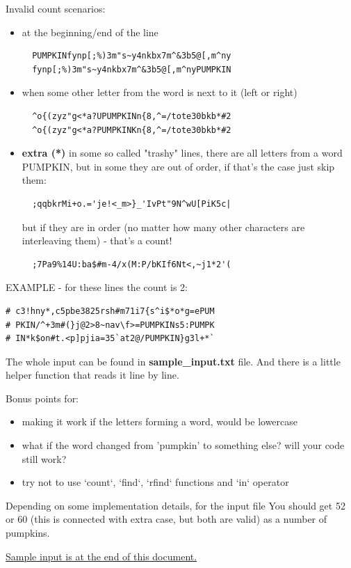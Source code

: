 \documentclass[12pt]{article}
\begin{document}
\begin{flushleft}
Invalid count scenarios:
\begin{itemize}
  \item at the beginning/end of the line
  \begin{verbatim}
  PUMPKINfynp[;%)3m"s~y4nkbx7m^&3b5@[,m^ny
  fynp[;%)3m"s~y4nkbx7m^&3b5@[,m^nyPUMPKIN
  \end{verbatim}
  \item when some other letter from the word is next to it (left or right)
  \begin{verbatim}
  ^o{(zyz"g<*a?UPUMPKINn{8,^=/tote30bkb*#2
  ^o{(zyz"g<*a?PUMPKINKn{8,^=/tote30bkb*#2
  \end{verbatim}
  \item \textbf{extra (*)} in some so called "trashy" lines, there are all letters from a word PUMPKIN, but in some they are out of order, if that's the case just skip them:
  \begin{verbatim}
  ;qqbkrMi+o.='je!<_m>}_'IvPt"9N^wU[PiK5c|
  \end{verbatim}
  but if they are in order (no matter how many other characters are interleaving them) - that's a count!
  \begin{verbatim}
  ;7Pa9%14U:ba$#m-4/x(M:P/bKIf6Nt<,~j1*2'(
  \end{verbatim}
\end{itemize}

EXAMPLE - for these lines the count is 2:
\begin{verbatim}
# c3!hny*,c5pbe3825rsh#m71i7{s^i$*o*g=ePUM
# PKIN/^+3m#(}j@2>8~nav\f>=PUMPKINs5:PUMPK
# IN*k$on#t.<p]pjia=35`at2@/PUMPKIN}g3l+*`
\end{verbatim}
\vspace{1cm}

The whole input can be found in \textbf{sample\_input.txt} file. And there is a little helper function that reads it line by line.
\vspace{0.5cm}

Bonus points for:

\begin{itemize}
  \item making it work if the letters forming a word, would be lowercase
  \item what if the word changed from 'pumpkin' to something else? will your code still work?
  \item try not to use `count`, `find`, `rfind` functions and `in` operator
\end{itemize}

\vspace{1cm}
Depending on some implementation details, for the input file You should get 52 or 60 (this is connected with extra case, but both are valid) as a number of pumpkins.

\vspace{1cm}
\hyperlink{example}{Sample input is at the end of this document.}

\end{flushleft}
\end{document}
